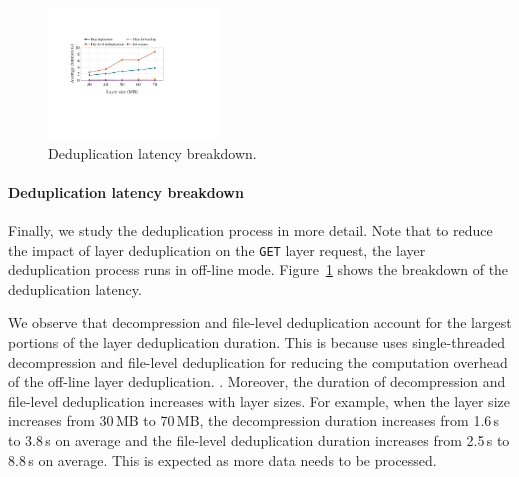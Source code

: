 \begin{figure}[t]
	\centering
	\includegraphics[width=0.4\textwidth]{graphs/dedupbreakdown.pdf}
	\caption{Deduplication latency breakdown.}
	\label{fig:eval-dedupbreakdown}
\end{figure}

\paragraph{Deduplication latency breakdown}
%
Finally, we study the deduplication process in more detail.
%
Note that to reduce the impact of layer deduplication on the \texttt{GET} layer request,
the layer deduplication process runs in off-line mode.
%
Figure~\ref{fig:eval-dedupbreakdown} shows the breakdown of the deduplication latency.

We observe that decompression and file-level deduplication account for the largest portions of
the layer deduplication duration.
%
%
This is because \sysname uses single-threaded decompression and file-level deduplication for
reducing the computation overhead of the off-line layer deduplication.
%
.
%
Moreover, the duration of decompression and file-level deduplication increases with layer sizes.
%
For example, when the layer size increases from 30\,MB to 70\,MB, 
the decompression duration increases from 1.6\,s to 3.8\,s on average and the file-level deduplication duration increases from 2.5\,s to 8.8\,s on average.
%
This is expected as more data needs to be processed.


